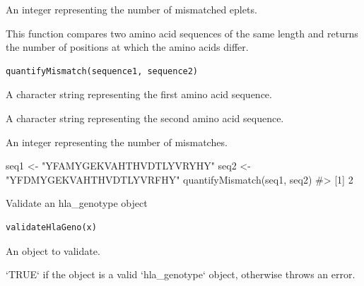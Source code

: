 \documentclass[letterpaper]{book}
\begin{document}
%
\begin{Value}
An integer representing the number of mismatched eplets.
\end{Value}
%
\begin{Description}
This function compares two amino acid sequences of the same length and
returns the number of positions at which the amino acids differ.
\end{Description}
%
\begin{Usage}
\begin{verbatim}
quantifyMismatch(sequence1, sequence2)
\end{verbatim}
\end{Usage}
%
\begin{Arguments}
\begin{ldescription}
\item[\code{sequence1}] A character string representing the first amino acid sequence.

\item[\code{sequence2}] A character string representing the second amino acid sequence.
\end{ldescription}
\end{Arguments}
%
\begin{Value}
An integer representing the number of mismatches.
\end{Value}
%
\begin{Examples}
\begin{ExampleCode}
seq1 <- "YFAMYGEKVAHTHVDTLYVRYHY"
seq2 <- "YFDMYGEKVAHTHVDTLYVRFHY"
quantifyMismatch(seq1, seq2)
#> [1] 2

\end{ExampleCode}
\end{Examples}
%
\begin{Description}
Validate an hla\_genotype object
\end{Description}
%
\begin{Usage}
\begin{verbatim}
validateHlaGeno(x)
\end{verbatim}
\end{Usage}
%
\begin{Arguments}
\begin{ldescription}
\item[\code{x}] An object to validate.
\end{ldescription}
\end{Arguments}
%
\begin{Value}
`TRUE` if the object is a valid `hla\_genotype` object, otherwise
throws an error.
\end{Value}
\printindex{}
\end{document}
